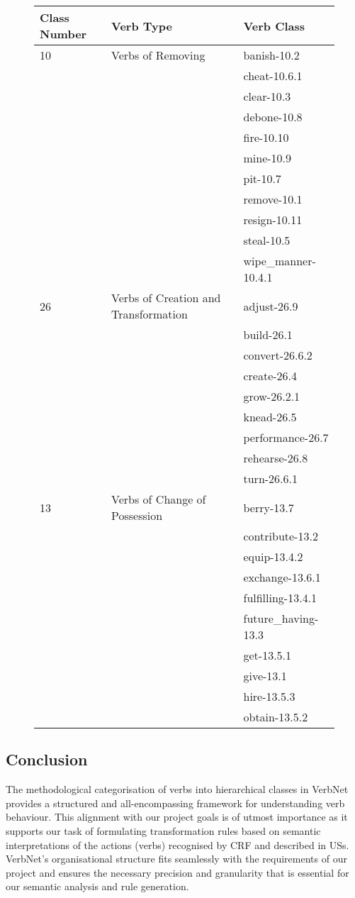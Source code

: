 \begin{figure}
\begingroup
\footnotesize
\centering
\begin{tabularx}{12cm}{l  l  l}
\hline
Class Number	&Verb Type	&Verb Class \\
\hline 
\hline
10&	Verbs of Removing		&banish-10.2 \\
&&cheat-10.6.1\\
&&clear-10.3\\
&&debone-10.8\\
&&fire-10.10\\
&&mine-10.9\\
&&pit-10.7\\
&&remove-10.1\\
&&resign-10.11\\
&&steal-10.5\\
&&wipe\_manner-10.4.1\\
\hline
26	&Verbs of Creation and Transformation	&adjust-26.9 \\
&&build-26.1 \\
&&convert-26.6.2\\
&&create-26.4\\
&&grow-26.2.1\\
&&knead-26.5\\
&&performance-26.7\\
&&rehearse-26.8\\
&&turn-26.6.1\\
\hline
13&	Verbs of Change of Possession	&berry-13.7 \\
&&contribute-13.2\\
&&equip-13.4.2\\
&&exchange-13.6.1\\
&&fulfilling-13.4.1\\
&&future\_having-13.3\\
&&get-13.5.1\\
&&give-13.1\\
&&hire-13.5.3\\
&&obtain-13.5.2\\
\hline
\end{tabularx}

\label{tb:vtype_example}

\endgroup
\end{figure}
\subsection*{Conclusion}\label{nlp_bottom_line}
The methodological categorisation of verbs into hierarchical classes in VerbNet provides a structured and all-encompassing framework for understanding verb behaviour. This alignment with our project goals is of utmost importance as it supports our task of formulating transformation rules based on semantic interpretations of the actions (verbs) recognised by CRF and described in USs. VerbNet's organisational structure fits seamlessly with the requirements of our project and ensures the necessary precision and granularity that is essential for our semantic analysis and rule generation.
